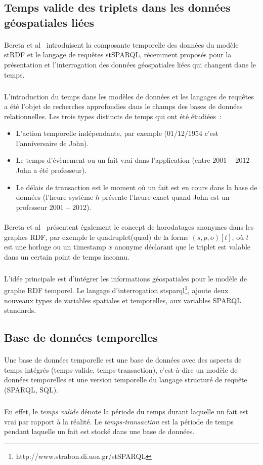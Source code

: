 \documentclass[12pt,a4]{report}
\begin{document}
\subsection{Temps valide des triplets dans les données géospatiales liées}
\paragraph{}
Bereta et al~\cite{bereta2013} introduisent la composante temporelle des données du modèle stRDF et le langage de requêtes stSPARQL, récemment proposés pour la présentation et l’interrogation des données géospatiales liées qui changent dans le temps.
\subparagraph{}
L’introduction du temps dans les modèles de données et les langages de requêtes a été l’objet de recherches approfondies dans le champs des bases de données relationnelles.
\newline
Les trois types distincts de temps qui ont été étudiées~:
\begin{itemize}
\item L'action temporelle indépendante, par exemple ($01/12/1954$ c’est l’anniversaire de John).
\item Le temps d’évènement ou un fait vrai dans l’application (entre $2001-2012$ John a été professeur).
\item Le délais de transaction est le moment où un fait est en cours dans la base de données (l’heure système $h$ présente l’heure exact quand John est un professeur $2001-2012$).
\end{itemize}
\paragraph{}
Bereta et al~\cite{bereta2013} présentent également le concept de horodatages anonymes dans les graphes RDF, par exemple le quadruplet(quad) de la forme $(s, p, o)[t]$, où $t$ est une horloge ou un timestamp $x$ anonyme déclarant que le triplet est valable dans un certain point de temps inconnu.
\subparagraph{}
L’idée principale est d’intégrer les informations géospatiales pour le modèle de graphe RDF temporel. Le langage d’interrogation \gls{stsparql}\footnote{http://www.strabon.di.uoa.gr/stSPARQL}, ajoute deux nouveaux types de variables spatiales et temporelles, aux variables SPARQL standards.
\subsection{Base de données temporelles}
\paragraph{}
Une base de données temporelle est une base de données avec des aspects de temps intégrés (temps-valide, temps-transaction), c'est-à-dire un modèle de données temporelles et une version temporelle du langage structuré de requête (SPARQL, SQL).
\subparagraph{}
En effet, le \textit{temps valide} dénote la période du temps durant laquelle un fait est vrai par rapport à la réalité.
Le \textit{temps-transaction} est la période de temps pendant laquelle un fait est stocké dans une base de données.
\end{document}
